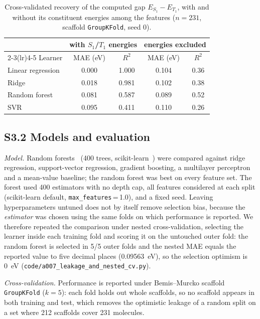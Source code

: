 \documentclass[final,3p,times,twocolumn]{elsarticle}
\begin{document}
\begin{table}[t]
  \centering
  \caption{Cross-validated recovery of the computed gap $E_{S_1}-E_{T_1}$, with and
    without its constituent energies among the features ($n = \num{231}$, scaffold
    \texttt{GroupKFold}, seed \num{0}).}
  \label{tab:leakage}
  \begin{tabular}{lcccc}
    \toprule
    & \multicolumn{2}{c}{with $S_1$/$T_1$ energies} & \multicolumn{2}{c}{energies excluded} \\
    \cmidrule(lr){2-3}\cmidrule(lr){4-5}
    Learner & MAE (eV) & $R^2$ & MAE (eV) & $R^2$ \\
    \midrule
    Linear regression & 0.000 & 1.000 & 0.104 & 0.36 \\
    Ridge             & 0.018 & 0.981 & 0.102 & 0.38 \\
    Random forest     & 0.081 & 0.587 & 0.089 & 0.52 \\
    SVR               & 0.095 & 0.411 & 0.110 & 0.26 \\
    \bottomrule
  \end{tabular}
\end{table}

\subsection*{S3.2 Models and evaluation}
\emph{Model.} Random forests~\cite{Breiman2001} (\num{400} trees,
scikit-learn~\cite{Pedregosa2011}) were compared against ridge regression,
support-vector regression, gradient boosting, a multilayer perceptron and a mean-value
baseline; the random forest was best on every feature set. The forest used \num{400}
estimators with no depth cap, all features considered at each split (scikit-learn default, \texttt{max\_features}\,=\,1.0), and a fixed seed.
Leaving hyperparameters untuned does not by itself remove selection bias, because the
\emph{estimator} was chosen using the same folds on which performance is reported. We
therefore repeated the comparison under nested cross-validation, selecting the learner
inside each training fold and scoring it on the untouched outer fold: the random forest
is selected in \num{5}/\num{5} outer folds and the nested MAE equals the reported value
to five decimal places (\qty{0.09563}{\electronvolt}), so the selection optimism is
\qty{0}{\electronvolt} (\texttt{code/a007\_leakage\_and\_nested\_cv.py}).

\emph{Cross-validation.} Performance is reported under Bemis--Murcko scaffold
\texttt{GroupKFold} ($k=5$): each fold holds out whole scaffolds, so no scaffold
appears in both training and test, which removes the optimistic leakage of a
random split on a set where \num{212} scaffolds cover \num{231} molecules.
\end{document}
